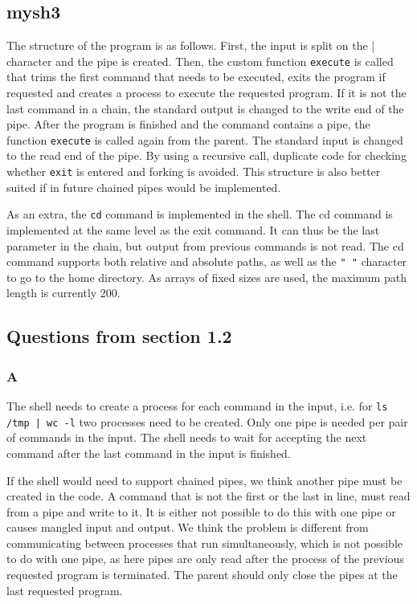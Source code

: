 \documentclass[11pt]{article}
\begin{document}
\subsection{mysh3}

The structure of the program is as follows. First, the input is split on the | character and the pipe is created. Then, the custom function \texttt{execute} is called that trims the first command that needs to be executed, exits the program if requested and creates a process to execute the requested program. If it is not the last command in a chain, the standard output is changed to the write end of the pipe. After the program is finished and the command contains a pipe, the function \texttt{execute} is called again from the parent. The standard input is changed to the read end of the pipe. By using a recursive call, duplicate code for checking whether \texttt{exit} is entered and forking is avoided. This structure is also better suited if in future chained pipes would be implemented.

As an extra, the \texttt{cd} command is implemented in the shell. The cd command is implemented at the same level as the exit command. It can thus be the last parameter in the chain, but output from previous commands is not read. The cd command supports both relative and absolute paths, as well as the \texttt{"~"} character to go to the home directory. As arrays of fixed sizes are used, the maximum path length is currently 200.

\subsection{Questions from section 1.2}

\subsubsection{A}

The shell needs to create a process for each command in the input, i.e. for \texttt{ls /tmp | wc -l} two processes need to be created. Only one pipe is needed per pair of commands in the input. The shell needs to wait for accepting the next command after the last command in the input is finished.

If the shell would need to support chained pipes, we think another pipe must be created in the code. A command that is not the first or the last in line, must read from a pipe and write to it. It is either not possible to do this with one pipe or causes mangled input and output. We think the problem is different from communicating between processes that run simultaneously, which is not possible to do with one pipe, as here pipes are only read after the process of the previous requested program is terminated. The parent should only close the pipes at the last requested program.
\end{document}
